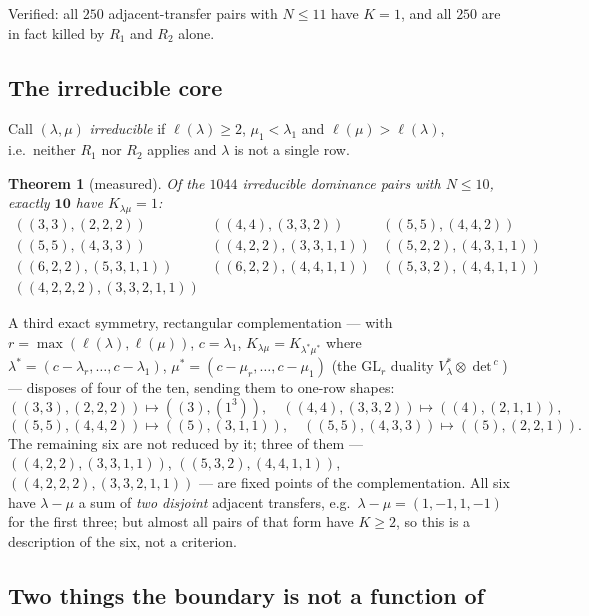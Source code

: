 \documentclass[11pt]{article}
\theoremstyle{plain}
\newtheorem{theorem}{Theorem}
\theoremstyle{definition}
\begin{document}
Verified: all $250$ adjacent-transfer pairs with $N\le11$ have $K=1$, and all $250$ are
in fact killed by $R_1$ and $R_2$ alone.

\subsection{The irreducible core}

Call $(\lambda,\mu)$ \emph{irreducible} if $\ell(\lambda)\ge2$, $\mu_1<\lambda_1$ and
$\ell(\mu)>\ell(\lambda)$, i.e.\ neither $R_1$ nor $R_2$ applies and $\lambda$ is not a
single row.

\begin{theorem}[measured]\label{thm:core}
Of the $1044$ irreducible dominance pairs with $N\le10$, exactly $\mathbf{10}$ have
$K_{\lambda\mu}=1$:
\[
\begin{array}{lll}
 ((3,3),(2,2,2)) & ((4,4),(3,3,2)) & ((5,5),(4,4,2))\\
 ((5,5),(4,3,3)) & ((4,2,2),(3,3,1,1)) & ((5,2,2),(4,3,1,1))\\
 ((6,2,2),(5,3,1,1)) & ((6,2,2),(4,4,1,1)) & ((5,3,2),(4,4,1,1))\\
 ((4,2,2,2),(3,3,2,1,1)) & &
\end{array}
\]
\end{theorem}

A third exact symmetry, rectangular complementation --- with $r=\max(\ell(\lambda),\ell(\mu))$,
$c=\lambda_1$, $K_{\lambda\mu}=K_{\lambda^*\mu^*}$ where
$\lambda^*=(c-\lambda_r,\dots,c-\lambda_1)$, $\mu^*=(c-\mu_r,\dots,c-\mu_1)$ (the
$\mathrm{GL}_r$ duality $V_\lambda^*\otimes\det^{\,c}$) --- disposes of four of the ten,
sending them to one-row shapes:
\[
 ((3,3),(2,2,2))\mapsto((3),(1^3)),\quad ((4,4),(3,3,2))\mapsto((4),(2,1,1)),
\]
\[
 ((5,5),(4,4,2))\mapsto((5),(3,1,1)),\quad ((5,5),(4,3,3))\mapsto((5),(2,2,1)).
\]
The remaining six are not reduced by it; three of them --- $((4,2,2),(3,3,1,1))$,
$((5,3,2),(4,4,1,1))$, $((4,2,2,2),(3,3,2,1,1))$ --- are fixed points of the
complementation.  All six have $\lambda-\mu$ a sum of \emph{two disjoint} adjacent
transfers, e.g.\ $\lambda-\mu=(1,-1,1,-1)$ for the first three; but almost all pairs of
that form have $K\ge2$, so this is a description of the six, not a criterion.

\subsection{Two things the boundary is not a function of}\label{sec:obstruction}
\end{document}
